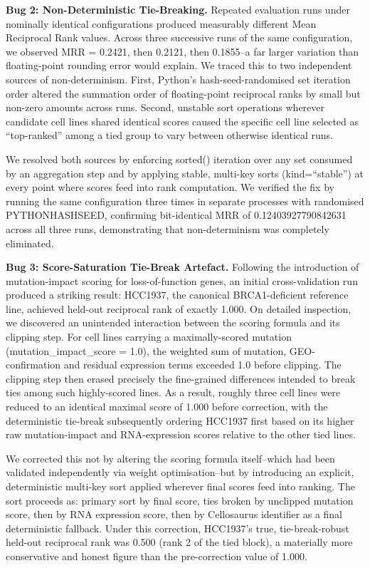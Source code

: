 \documentclass[author={Karen Coutinho, Ishaan Bhalla, Aman Raj, Dixit Kaloorani Malarmannan},
                supervisor={Dr. Daniel D'Andrea},
                degree={MSc},
                title={CellSelector Omics: A Multi-Omics Recommendation System for Cell Line Selection},
                subtitle={},
                type={},
                year={2026}]{dissertation}
\begin{document}
{\bf Bug 2: Non-Deterministic Tie-Breaking.} Repeated evaluation runs under nominally identical configurations produced measurably different Mean Reciprocal Rank values. Across three successive runs of the same configuration, we observed MRR = 0.2421, then 0.2121, then 0.1855--a far larger variation than floating-point rounding error would explain. We traced this to two independent sources of non-determinism. First, Python's hash-seed-randomised set iteration order altered the summation order of floating-point reciprocal ranks by small but non-zero amounts across runs. Second, unstable sort operations wherever candidate cell lines shared identical scores caused the specific cell line selected as ``top-ranked'' among a tied group to vary between otherwise identical runs.

We resolved both sources by enforcing sorted() iteration over any set consumed by an aggregation step and by applying stable, multi-key sorts (kind=``stable'') at every point where scores feed into rank computation. We verified the fix by running the same configuration three times in separate processes with randomised PYTHONHASHSEED, confirming bit-identical MRR of 0.12403927790842631 across all three runs, demonstrating that non-determinism was completely eliminated.

{\bf Bug 3: Score-Saturation Tie-Break Artefact.} Following the introduction of mutation-impact scoring for loss-of-function genes, an initial cross-validation run produced a striking result: HCC1937, the canonical BRCA1-deficient reference line, achieved held-out reciprocal rank of exactly 1.000. On detailed inspection, we discovered an unintended interaction between the scoring formula and its clipping step. For cell lines carrying a maximally-scored mutation (mutation\_impact\_score = 1.0), the weighted sum of mutation, GEO-confirmation and residual expression terms exceeded 1.0 before clipping. The clipping step then erased precisely the fine-grained differences intended to break ties among such highly-scored lines. As a result, roughly three cell lines were reduced to an identical maximal score of 1.000 before correction, with the deterministic tie-break subsequently ordering HCC1937 first based on its higher raw mutation-impact and RNA-expression scores relative to the other tied lines.

We corrected this not by altering the scoring formula itself--which had been validated independently via weight optimisation--but by introducing an explicit, deterministic multi-key sort applied wherever final scores feed into ranking. The sort proceeds as: primary sort by final score, ties broken by unclipped mutation score, then by RNA expression score, then by Cellosaurus identifier as a final deterministic fallback. Under this correction, HCC1937's true, tie-break-robust held-out reciprocal rank was 0.500 (rank 2 of the tied block), a materially more conservative and honest figure than the pre-correction value of 1.000.
\end{document}
